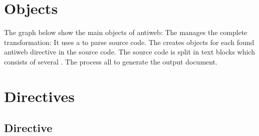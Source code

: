 \documentclass[letterpaper,10pt,english]{sphinxmanual}
\begin{document}
\section{Objects}
\label{antiweb:objects}
The graph below show the main objects of antiweb:
\noindent
The {\hyperref[antiweb:Document]{}} manages the complete transformation: It uses a
{\hyperref[antiweb:Reader]{}}  to parse source code. The {\hyperref[antiweb:Reader]{}}
creates {\hyperref[antiweb:directives]{}} objects for each found antiweb directive in the source
code. The source code is split in text blocks which consists of several
{\hyperref[antiweb:Line]{}}. The {\hyperref[antiweb:Document]{}} process all
{\hyperref[antiweb:directives]{}}  to generate the output document.


\section{Directives}
\label{antiweb:directives}\label{antiweb:id1}

\subsection{Directive}
\label{antiweb:directive}
\end{document}
